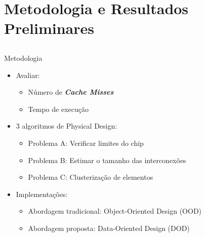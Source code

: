 \section{Metodologia e Resultados Preliminares}
\subsection*{}

\begin{frame}{Metodologia}
    \begin{itemize}
        \item Avaliar:
        \begin{itemize}
            \item Número de \textbf{\textit{Cache Misses}}
            \item Tempo de execução
        \end{itemize}
        \item 3 algoritmos de Physical Design:
        \begin{itemize}
            \item Problema A: Verificar limites do chip
            \item Problema B: Estimar o tamanho das interconexões
            \item Problema C: Clusterização de elementos
        \end{itemize}
        \item Implementações:
        \begin{itemize}
            \item Abordagem tradicional: Object-Oriented Design (OOD)
            \item Abordagem proposta: Data-Oriented Design (DOD) 
        \end{itemize}
    \end{itemize}
\end{frame}

